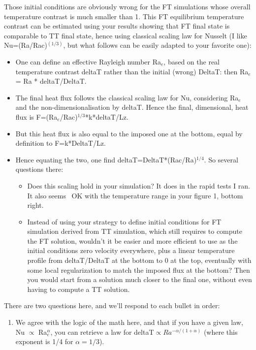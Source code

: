 \documentclass[aps, 11pt, singlecolumn]{revtex4-1} %
\begin{document}
\begin{singlespace}
\begin{myquotation}
Those initial conditions are obviously wrong for the FT simulations whose overall temperature contrast is much smaller than 1. 
This FT equilibrium temperature contrast can be estimated using your results showing that FT final state is comparable to TT final state, hence using classical scaling law for Nusselt (I like Nu=(Ra/Rac)$^(1/3)$, but what follows can be easily adapted to your favorite one):
\begin{itemize}
\item One can define an effective Rayleigh number Ra$_e$, based on the real temperature contrast deltaT rather than the initial (wrong) DeltaT: then Ra$_e$ = Ra * deltaT/DeltaT.
\item The final heat flux follows the classical scaling law for Nu, considering Ra$_e$ and the non-dimensionalisation by deltaT. 
Hence the final, dimensional, heat flux is F=(Ra$_e$/Rac)$^{1/3}$*k*deltaT/Lz.
\item But this heat flux is also equal to the imposed one at the bottom, equal by definition to F=k*DeltaT/Lz.
\item Hence equating the two, one find deltaT=DeltaT*(Rac/Ra)$^{1/4}$. So several questions there: 
\begin{itemize}
	\item Does this scaling hold in your simulation? It does in the rapid tests I ran. It also seems ~OK with the temperature range in your figure 1, bottom right.
	\item Instead of using your strategy to define initial conditions for FT simulation derived from TT simulation, which still requires to compute the FT solution, wouldn’t it be easier and more efficient to use as the initial conditions zero velocity everywhere, plus a linear temperature profile from deltaT/DeltaT at the bottom to 0 at the top, eventually with some local regularization to match the imposed flux at the bottom? 
	Then you would start from a solution much closer to the final one, without even having to compute a TT solution.
\end{itemize}
\end{itemize}
\end{myquotation}
There are two questions here, and we'll respond to each bullet in order:
\begin{enumerate}
\item We agree with the logic of the math here, and that if you have a given law, Nu $\propto$ Ra$_e^{\alpha}$, you can retrieve a law for deltaT$\propto Ra^{-\alpha/(1+\alpha)}$ (where this exponent is 1/4 for $\alpha = 1/3$).

\end{enumerate}
\end{singlespace}
\end{document}
